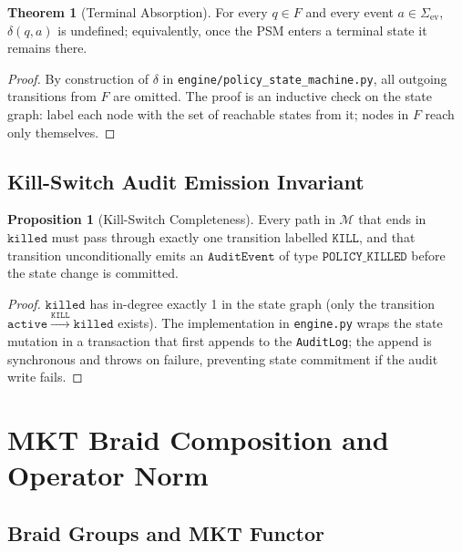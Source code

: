 \documentclass[12pt,letterpaper]{article}
\theoremstyle{definition}
\newtheorem{theorem}{Theorem}[section]
\newtheorem{proposition}{Proposition}[section]
\theoremstyle{remark}
\begin{document}
\begin{theorem}[Terminal Absorption]
  \label{thm:absorption}
  For every \(q \in F\) and every event \(a \in \Sigma_{\mathrm{ev}}\),
  \(\delta(q, a)\) is undefined; equivalently, once the PSM enters a terminal
  state it remains there.
\end{theorem}

\begin{proof}
  By construction of \(\delta\) in \texttt{engine/policy\_state\_machine.py},
  all outgoing transitions from \(F\) are omitted.  The proof is an inductive
  check on the state graph: label each node with the set of reachable states
  from it; nodes in \(F\) reach only themselves.
\end{proof}

\subsection{Kill-Switch Audit Emission Invariant}
\label{ssec:kill-switch}

\begin{proposition}[Kill-Switch Completeness]
  \label{prop:kill-switch}
  Every path in \(\mathcal{M}\) that ends in \(\mathtt{killed}\) must
  pass through exactly one transition labelled \(\mathtt{KILL}\), and that
  transition unconditionally emits an \(\mathtt{AuditEvent}\) of type
  \(\mathtt{POLICY\_KILLED}\) before the state change is committed.
\end{proposition}

\begin{proof}
  \(\mathtt{killed}\) has in-degree exactly 1 in the state graph (only the
  transition \(\mathtt{active} \xrightarrow{\mathtt{KILL}} \mathtt{killed}\)
  exists).  The implementation in \texttt{engine.py}
  wraps the state mutation in a transaction that first appends to the
  \texttt{AuditLog}; the append is synchronous and throws on failure,
  preventing state commitment if the audit write fails.
\end{proof}

\section{MKT Braid Composition and Operator Norm}
\label{sec:mkt}

\subsection{Braid Groups and MKT Functor}
\label{ssec:braid}
\end{document}
